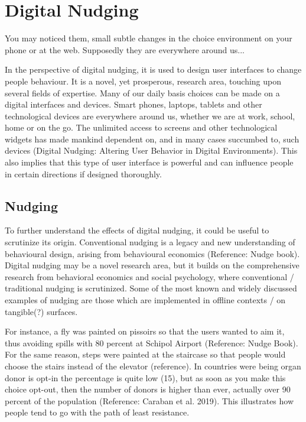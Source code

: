 \section{Digital Nudging}
You may noticed them, small subtle changes in the choice environment on your phone or at the web. Supposedly they are everywhere around us...


In the perspective of digital nudging, it is used to design user interfaces to change people behaviour. It is a novel, yet prosperous, research area, touching upon several fields of expertise. Many of our daily basis choices can be made on a digital interfaces and devices. Smart phones, laptops, tablets and other technological devices are everywhere around us, whether we are at work, school, home or on the go. The unlimited access to screens and other technological widgets has made mankind dependent on, and in many cases succumbed to, such devices (Digital Nudging: Altering User Behavior in Digital Environments). This also implies that this type of user interface is powerful and can influence people in certain directions if designed thoroughly. %

\subsection{Nudging}
To further understand the effects of digital nudging, it could be useful to scrutinize its origin. Conventional nudging is a legacy and new understanding of behavioural design, arising from behavioural economics (Reference: Nudge book). Digital nudging may be a novel research area, but it builds on the comprehensive research from behavioral economics and social psychology, where conventional / traditional nudging is scrutinized. Some of the most known and widely discussed examples of nudging are those which are implemented in offline contexts / on tangible(?) surfaces. 

For instance, a fly was painted on pissoirs so that the users wanted to aim it, thus avoiding spills with 80 percent at Schipol Airport (Reference: Nudge Book). For the same reason, steps were painted at the staircase so that people would choose the stairs instead of the elevator (reference). In countries were being organ donor is opt-in the percentage is quite low (15), but as soon as you make this choice opt-out, then the number of donors is higher than ever, actually over 90 percent of the population (Reference: Caraban et al. 2019). This illustrates how people tend to go with the path of least resistance. 

